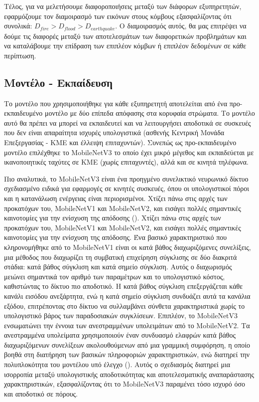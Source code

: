 Τέλος, για να μελετήσουμε διαφοροποιήσεις μεταξύ των διάφορων εξυπηρετητών, εφαρμόζουμε τον διαμοιρασμό των εικόνων στους κόμβους εξασφαλίζοντας ότι συνολικά: $D_{fire} > D_{flood} > D_{earthquake}$. Ο διαμοιρασμός αυτός, θα μας επιτρέψει να δούμε τις διαφορές μεταξύ των αποτελεσμάτων των διαφορετικών προβλημάτων και να καταλάβουμε την επίδραση των επιπλέον κόμβων ή επιπλέον δεδομένων σε κάθε περίπτωση.

\subsection{Μοντέλο - Εκπαίδευση}

Το μοντέλο που χρησιμοποιήθηκε για κάθε εξυπηρετητή αποτελείται από ένα προ-εκπαιδευμένο μοντέλο με δύο επίπεδα απόφασης στα κορυφαία στρώματα. Το μοντέλο αυτό θα πρέπει να μπορεί να εκπαιδευτεί και να λειτουργήσει αποδοτικά σε συσκευές που δεν είναι απαραίτητα ισχυρές υπολογιστικά (ασθενής Κεντρική Μονάδα Επεξεργασίας - ΚΜΕ και έλλειψη επιταχυντών). Συνεπώς ως προ-εκπαιδευμένο μοντέλο επιλέχθηκε το MobileNetV3 το οποίο έχει μικρό μέγεθος και εκπαιδεύεται με ικανοποιητικές ταχύτες σε ΚΜΕ (χωρίς επιταχυντές), αλλά και σε κινητά τηλέφωνα.

Πιο αναλυτικά, το MobileNetV3 είναι ένα προηγμένο συνελικτικό νευρωνικό δίκτυο σχεδιασμένο ειδικά για εφαρμογές σε κινητές συσκευές, όπου οι υπολογιστικοί πόροι και η κατανάλωση ενέργειας είναι περιορισμένοι. Χτίζει πάνω στις αρχές των προκατόχων του, MobileNetV1 και MobileNetV2, και εισάγει πολλές σημαντικές καινοτομίες για την ενίσχυση της απόδοσης (). Χτίζει πάνω στις αρχές των προκατόχων του, MobileNetV1 και MobileNetV2, και εισάγει πολλές σημαντικές καινοτομίες για την ενίσχυση της απόδοσης. Ένα βασικό χαρακτηριστικό που κληρονομήθηκε από το MobileNetV1 είναι οι κατά βάθος διαχωριζόμενες συνελίξεις, μια μέθοδος που διαχωρίζει τη συμβατική επιχείρηση σύγκλισης σε δύο διακριτά στάδια: κατά βάθος σύγκλιση και κατά σημείο σύγκλιση. Αυτός ο διαχωρισμός μειώνει σημαντικά τον αριθμό των παραμέτρων και το υπολογιστικό κόστος, καθιστώντας το δίκτυο πιο αποδοτικό. Η κατά βάθος σύγκλιση επεξεργάζεται κάθε κανάλι εισόδου ανεξάρτητα, ενώ η κατά σημείο σύγκλιση συνδυάζει αυτά τα κανάλια εξόδου, επιτρέποντας στο δίκτυο να συλλαμβάνει σύνθετα χαρακτηριστικά χωρίς το υπολογιστικό βάρος των παραδοσιακών συγκλίσεων. Επιπλέον, το MobileNetV3 ενσωματώνει την έννοια των ανεστραμμένων υπολειμάτων από το MobileNetV2. Τα ανεστραμμένα υπολείματα χρησιμοποιούν έναν συνδυασμό ελαφρών κατά βάθος διαχωριζόμενων συνελίξεων ακολουθούμενων από μια γραμμική συμφόρηση, η οποίο βοηθά στη διατήρηση των βασικών πληροφοριών χαρακτηριστικών, ενώ διατηρεί την πολυπλοκότητα του μοντέλου υπό έλεγχο (). Αυτός ο σχεδιασμός διατηρεί μια ισορροπία μεταξύ υπολογιστικής αποδοτικότητας και αποτελεσματικής αναπαράστασης χαρακτηριστικών, εξασφαλίζοντας ότι το MobileNetV3 παραμένει τόσο ισχυρό όσο και αποδοτικό σε πόρους.

